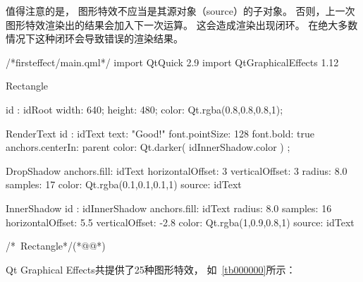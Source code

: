 值得注意的是，
图形特效不应当是其源对象（source）的子对象。
否则，上一次图形特效渲染出的结果会加入下一次运算。
这会造成渲染出现闭环。
在绝大多数情况下这种闭环会导致错误的渲染结果。

\label{f000051}    %
\FloatBarrier                                  %
\begin{thebookfilesourceone}[escapeinside={(*@}{@*)},
caption=GoodLuck,
title=\filesourcenumbernameone \thefilesourcenumber
]
/*firsteffect/main.qml*/
import QtQuick 2.9
import QtGraphicalEffects 1.12

Rectangle {

    id : idRoot
    width: 640;
    height: 480;
    color: Qt.rgba(0.8,0.8,0.8,1);

    RenderText{
        id : idText
        text: "Good!"
        font.pointSize: 128
        font.bold: true
        anchors.centerIn: parent
        color: Qt.darker( idInnerShadow.color ) ;
    }

    DropShadow{
        anchors.fill: idText
        horizontalOffset: 3
        verticalOffset: 3
        radius: 8.0
        samples: 17
        color: Qt.rgba(0.1,0.1,0.1,1)
        source: idText
    }

    InnerShadow{
        id : idInnerShadow
        anchors.fill: idText
        radius: 8.0
        samples: 16
        horizontalOffset: 5.5
        verticalOffset: -2.8
        color: Qt.rgba(1,0.9,0.8,1)
        source: idText
    }

}/*~Rectangle*/(*@\marginpar[\hfill\setlength\fboxsep{2pt}\fbox{\footnotesize{\kaishu\parbox{1em}{\setlength{\baselineskip}{2pt}\filesourcenumbernameone}}\footnotesize{\thefilesourcenumber}}]{\setlength\fboxsep{2pt}\fbox{\footnotesize{\kaishu\parbox{1em}{\setlength{\baselineskip}{2pt}\filesourcenumbernameone}}\footnotesize{\thefilesourcenumber}}}@*)\end{thebookfilesourceone}          %
\addtocounter{lstlisting}{-1}   %


Qt Graphical Effects共提供了25种图形特效，
如\tablename\ \ref{tb000000}所示：











